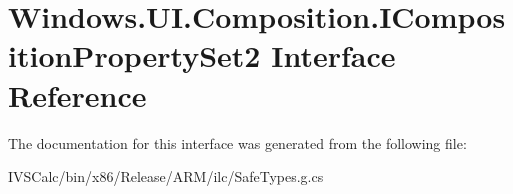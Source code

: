 \hypertarget{interface_windows_1_1_u_i_1_1_composition_1_1_i_composition_property_set2}{}\section{Windows.\+U\+I.\+Composition.\+I\+Composition\+Property\+Set2 Interface Reference}
\label{interface_windows_1_1_u_i_1_1_composition_1_1_i_composition_property_set2}


The documentation for this interface was generated from the following file\+:\begin{DoxyCompactItemize}
\item 
I\+V\+S\+Calc/bin/x86/\+Release/\+A\+R\+M/ilc/Safe\+Types.\+g.\+cs\end{DoxyCompactItemize}
